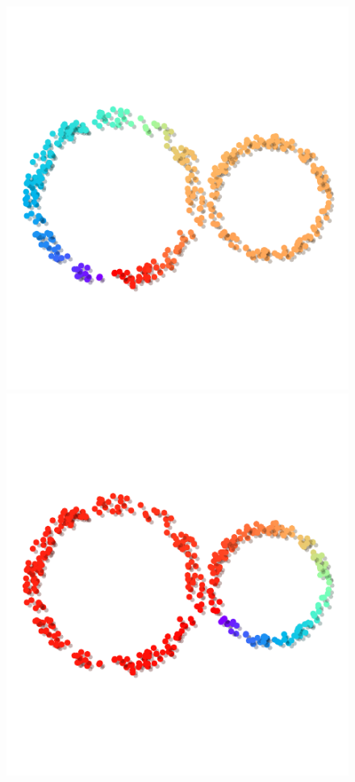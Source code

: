 \begin{figure}[htbp]
\centering
  \includegraphics[scale=0.8]{figures/circular_coords1.pdf}
  \includegraphics[scale=0.8]{figures/circular_coords2.pdf}\\\vspace{-7ex}

\end{figure}

